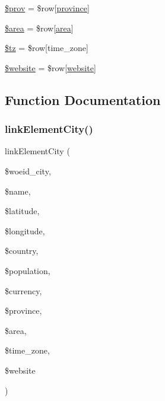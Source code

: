 \begin{DoxyCompactItemize}
\item 
\mbox{\hyperlink{rss__population_8php_a02807a8d679a843a0e105217f5570c6f}{\$prov}} = \$row\mbox{[}\textquotesingle{}\mbox{\hyperlink{index_8php_a38d70414c65575df5643ad4296c9db2e}{province}}\textquotesingle{}\mbox{]}
\item 
\mbox{\hyperlink{rss__population_8php_a460a08379d150f8c151a07ad9a3251cd}{\$area}} = \$row\mbox{[}\textquotesingle{}\mbox{\hyperlink{index_8php_a5198216176428aa2303311f956213f33}{area}}\textquotesingle{}\mbox{]}
\item 
\mbox{\hyperlink{rss__population_8php_a6cdebd78b0146538e96a994de1c736d6}{\$tz}} = \$row\mbox{[}\textquotesingle{}time\+\_\+zone\textquotesingle{}\mbox{]}
\item 
\mbox{\hyperlink{rss__population_8php_a2887d41d3bb2498db735eeb87efa2d73}{\$website}} = \$row\mbox{[}\textquotesingle{}\mbox{\hyperlink{index_8php_a8c56014cff17c1ced653aa98455da680}{website}}\textquotesingle{}\mbox{]}
\end{DoxyCompactItemize}


\subsection{Function Documentation}
\mbox{\label{rss__population_8php_a80f568297246ccd95f4a6a4a2f7d94f8}} 
\subsubsection{\texorpdfstring{linkElementCity()}{linkElementCity()}}
{\footnotesize\ttfamily link\+Element\+City (\begin{DoxyParamCaption}\item[{}]{\$woeid\+\_\+city,  }\item[{}]{\$name,  }\item[{}]{\$latitude,  }\item[{}]{\$longitude,  }\item[{}]{\$country,  }\item[{}]{\$population,  }\item[{}]{\$currency,  }\item[{}]{\$province,  }\item[{}]{\$area,  }\item[{}]{\$time\+\_\+zone,  }\item[{}]{\$website }\end{DoxyParamCaption})}



